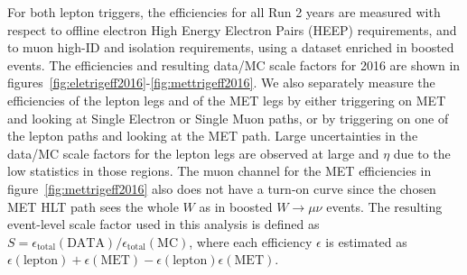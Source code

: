 For both lepton triggers, the efficiencies for all Run 2 years are measured with respect to offline electron High Energy Electron Pairs (HEEP) requirements, and to muon high-\pt ID and isolation requirements, using a dataset enriched in boosted \Wjets events.
The efficiencies and resulting data/MC scale factors for 2016 are shown in figures~\ref{fig:eletrigeff2016}-\ref{fig:mettrigeff2016}.
We also separately measure the efficiencies of the lepton legs and of the MET legs by either triggering on MET and looking at Single Electron or Single Muon paths, or by triggering on one of the lepton paths and looking at the MET path.
Large uncertainties in the data/MC scale factors for the lepton legs are observed at large \pt and $\eta$ due to the low statistics in those regions.
The muon channel for the MET efficiencies in figure~\ref{fig:mettrigeff2016} also does not have a turn-on curve since the chosen MET HLT path sees the whole $W$ as \ptmiss in boosted $W\to\mu\nu$ events.
The resulting event-level scale factor used in this analysis is defined as $S=\epsilon_\mathrm{total}(\mathrm{DATA})/\epsilon_\mathrm{total}(\mathrm{MC})$, where each efficiency $\epsilon$ is estimated as $\epsilon(\mathrm{lepton})+\epsilon(\mathrm{MET})-\epsilon(\mathrm{lepton})\epsilon(\mathrm{MET})$.

